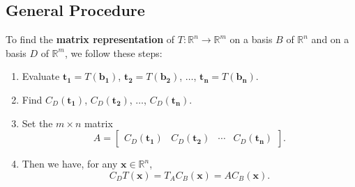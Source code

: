 \documentclass[20pt,a4paper]{extarticle}
\newcommand{\ra}{\rightarrow}
\begin{document}
	\newpage 

	\phantom{2}

	\newpage 

	\subsection{General Procedure}

	To find the \textbf{matrix representation} of $T : \mathbb{R}^n \ra \mathbb{R}^m$ on a basis $B$ of $\mathbb{R}^n$ and on a basis $D$ of $\mathbb{R}^m$, we follow these steps:
		\begin{enumerate}[label=\Circled{\arabic*}]
			\item Evaluate $\mathbf{t_1} = T(\mathbf{b_1})$, $\mathbf{t_2} = T (\mathbf{b_2})$, $\ldots$, $\mathbf{t_n} = T (\mathbf{b_n})$.
			\item Find $C_D (\mathbf{t_1})$, $C_D (\mathbf{t_2})$, $\ldots$, $C_D (\mathbf{t_n})$.
			\item Set the $m \times n$ matrix
				\[
					A = \begin{bmatrix} C_D (\mathbf{t_1}) & C_D (\mathbf{t_2}) & \cdots & C_D (\mathbf{t_n}) \end{bmatrix} .
				\]
			\item Then we have, for any $\mathbf{x} \in \mathbb{R}^n$,
				\[
					C_D T (\mathbf{x}) = T_A C_B (\mathbf{x}) = A C_B (\mathbf{x}) .
				\]
		\end{enumerate}
\end{document}
